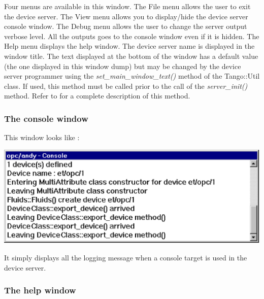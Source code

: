 \vspace{0.3cm}


Four menus are available in this window. The File menu allows the
user to exit the device server. The View menu allows you to display/hide
the device server console window. The Debug menu allows the user to
change the server output verbose level. All the outputs
goes to the console window even if it is hidden. The Help menu displays
the help window. The device server name is displayed in the window
title. The text displayed at the bottom of the window has a default
value (the one displayed in this window dump) but may be changed by
the device server programmer using the \emph{set\_main\_window\_text()}
method of the Tango::Util class. If used, this method must be called
prior to the call of the \emph{server\_init()}
method. Refer to \cite{TANGO_ref_man} for a complete description
of this method.


\subsubsection{The console window}

This window looks like :

\vspace{0.3cm}


\begin{center}
\includegraphics[width=14cm]{ds_writing/nt_server/cons}
\par\end{center}

\vspace{0.3cm}


It simply displays all the logging\emph{} message
when a console target is used in the device server. 


\subsubsection{The help window}

